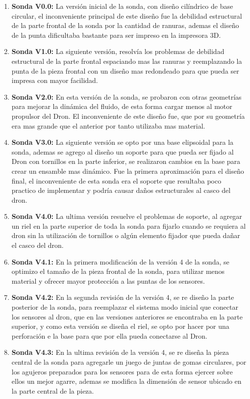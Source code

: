 \begin{enumerate}
\item \textbf{Sonda V0.0:} La versión inicial de la sonda, con diseño cilíndrico de base circular, el inconveniente principal de este diseño fue la debilidad estructural de la parte frontal de la sonda por la cantidad de ranuras, ademas el diseño de la punta dificultaba bastante para ser impreso en la impresora 3D.
\item \textbf{Sonda V1.0:} La siguiente versión, resolvía los problemas de debilidad estructural de la parte frontal espaciando mas las ranuras y reemplazando la punta de la pieza frontal con un diseño mas redondeado para que pueda ser impresa con mayor facilidad.   
\item \textbf{Sonda V2.0:} En esta versión de la sonda, se probaron con otras geometrías para mejorar la dinámica del fluido, de esta forma cargar menos al motor propulsor del Dron. El inconveniente de este diseño fue, que por su geometría era mas grande que el anterior por tanto utilizaba mas material.
\item \textbf{Sonda V3.0:} La siguiente versión se opto por una base elipsoidal para la sonda, ademas se agrego al diseño un soporte para que pueda ser fijado al Dron con tornillos en la parte inferior, se realizaron cambios en la base para crear un ensamble mas dinámico. Fue la primera aproximación para el diseño final, el inconveniente de esta sonda era el soporte que resultaba poco practico de implementar y podría causar daños estructurales al casco del dron.
\item \textbf{Sonda V4.0:} La ultima versión resuelve el problemas de soporte, al agregar un riel en la parte superior de toda la sonda para fijarlo cuando se requiera al dron sin la utilización de tornillos o algún elemento fijador que pueda dañar el casco del dron.
\item \textbf{Sonda V4.1:} En la primera modificación de la versión 4 de la sonda, se optimizo el tamaño de la pieza frontal de la sonda,  para utilizar menos material y ofrecer mayor protección a las puntas de los sensores.
\item \textbf{Sonda V4.2:} En la segunda revisión de la versión 4, se re diseño la parte posterior de la sonda, para reemplazar el sistema modo inicial que conectar los sensores al dron, que en las versiones anteriores se encontraba en la parte superior, y como esta versión se diseña el riel, se opto por hacer por una perforación e la base para que por ella pueda conectarse al Dron.
\item \textbf{Sonda V4.3:} En la ultima revisión de la versión 4, se re diseña la pieza central de la sonda para agregarle un juego de juntas de gomas circulares, por los agujeros preparados para los sensores para de esta forma ejercer sobre ellos un mejor agarre, ademas se modifica la dimensión de sensor ubicado en la parte central de la pieza.
\end{enumerate}


